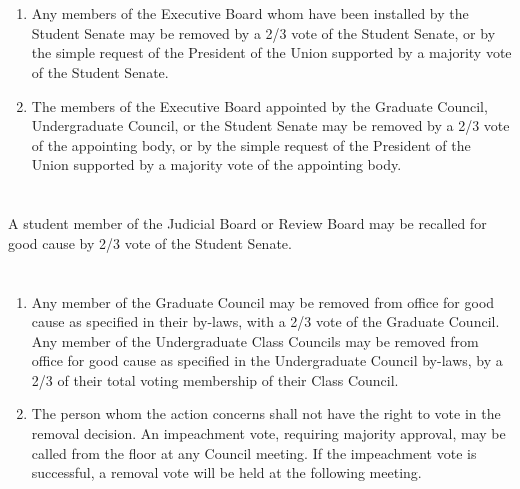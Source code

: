 \documentclass{uniondoc}
\begin{document}
\section{}

\begin{enumerate}
\item Any members of the Executive Board whom have been installed by the Student Senate may be removed by a 2/3 vote of the Student Senate, or by the simple request of the President of the Union supported by a majority vote of the Student Senate.
\item The members of the Executive Board appointed by the Graduate Council, Undergraduate Council, or the Student Senate may be removed by a 2/3 vote of the appointing body, or by the simple request of the President of the Union supported by a majority vote of the appointing body.
\end{enumerate}

\section{}

A student member of the Judicial Board or Review Board may be recalled for good cause by 2/3 vote of the Student Senate.

\section{}

\begin{enumerate}
\item Any member of the Graduate Council may be removed from office for good cause as specified in their by-laws, with a 2/3 vote of the Graduate Council. Any member of the Undergraduate Class Councils may be removed from office for good cause as specified in the Undergraduate Council by-laws, by a 2/3 of their total voting membership of their Class Council.
\item The person whom the action concerns shall not have the right to vote in the removal decision. An impeachment vote, requiring majority approval, may be called from the floor at any Council meeting. If the impeachment vote is successful, a removal vote will be held at the following meeting.
\end{enumerate}


\section{}
\end{document}
